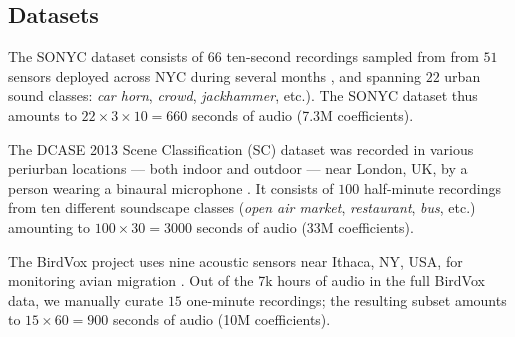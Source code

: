 \documentclass[journal]{IEEEtran}
\makeatletter
\newcommand*{\eg}{e.g.\@\xspace}
\newcommand*{\etc}{etc.\@\xspace}
\theoremstyle{remark}
\makeatother
\begin{document}
\subsection{Datasets}
The SONYC dataset consists of $66$ ten-second recordings sampled from from $51$ sensors deployed across NYC during several months \cite{bello2018cacm}, and spanning $22$ urban sound classes: \textit{car horn}, \textit{crowd}, \textit{jackhammer}, \etc{}).
The SONYC dataset thus amounts to $22\times3\times10 = 660$ seconds of audio (7.3M coefficients).

The DCASE 2013 Scene Classification (SC) dataset was recorded in various periurban locations --- both indoor and outdoor --- near London, UK, by a person wearing a binaural microphone \cite{stowell2015detection}.
It consists of $100$ half-minute recordings from ten different soundscape classes (\emph{open air market}, \emph{restaurant}, \emph{bus}, etc.) amounting to $100\times30 = 3000$ seconds of audio (33M coefficients).

The BirdVox project uses nine acoustic sensors near Ithaca, NY, USA, for monitoring avian migration \cite{lostanlen2017icassp}.
Out of the 7k hours of audio in the full BirdVox data, we manually curate $15$ one-minute recordings; the resulting subset amounts to $15\times60 = 900$ seconds of audio (10M coefficients).
\end{document}
